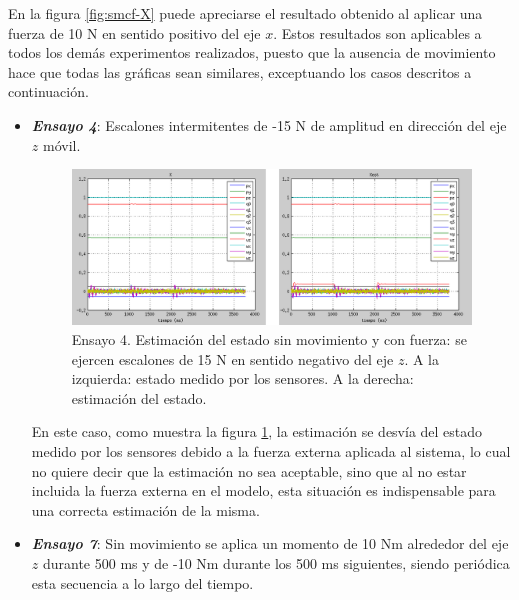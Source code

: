 En la figura \ref{fig:smcf-X} puede apreciarse el resultado obtenido al aplicar una fuerza de 10 N en sentido positivo del eje $x$. Estos resultados son aplicables a todos los demás experimentos realizados, puesto que la ausencia de movimiento hace que todas las gráficas sean similares, exceptuando los casos descritos a continuación. \par 

\begin{itemize}

\item \textbf{\emph{Ensayo 4}}: Escalones intermitentes de -15 N de amplitud en dirección del eje $z$ móvil.

\begin{figure}[h!]
\centering
\includegraphics[scale=0.4]{Figuras/smcf-X-Fz}
\caption[Ensayo 4. Estimación del estado sin movimiento y con fuerza]{Ensayo 4. Estimación del estado sin movimiento y con fuerza: se ejercen escalones de 15 N en sentido negativo del eje $z$. A la izquierda: estado medido por los sensores. A la derecha: estimación del estado.}
\label{fig:smcf-X-Fz}
\end{figure}

En este caso, como muestra la figura \ref{fig:smcf-X-Fz}, la estimación se desvía del estado medido por los sensores debido a la fuerza externa aplicada al sistema, lo cual no quiere decir que la estimación no sea aceptable, sino que al no estar incluida la fuerza externa en el modelo, esta situación es indispensable para una correcta estimación de la misma. \par 

\item \textbf{\emph{Ensayo 7}}: Sin movimiento se aplica un momento de 10 Nm alrededor del eje $z$ durante 500 ms y de -10 Nm durante los 500 ms siguientes, siendo periódica esta secuencia a lo largo del tiempo. \par 


\end{itemize}
